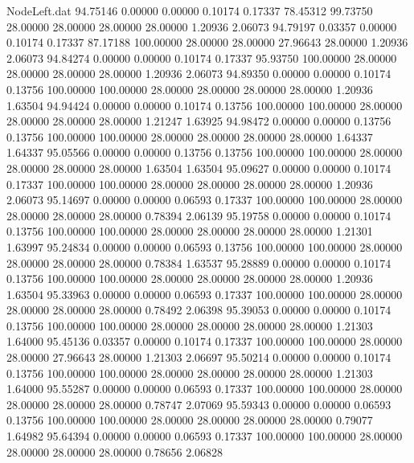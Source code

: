 \begin{filecontents}{NodeLeft.dat}
  94.75146    0.00000    0.00000     0.10174    0.17337   78.45312   99.73750   28.00000   28.00000   28.00000   28.00000    1.20936    2.06073
  94.79197    0.03357    0.00000     0.10174    0.17337   87.17188  100.00000   28.00000   28.00000   27.96643   28.00000    1.20936    2.06073
  94.84274    0.00000    0.00000     0.10174    0.17337   95.93750  100.00000   28.00000   28.00000   28.00000   28.00000    1.20936    2.06073
  94.89350    0.00000    0.00000     0.10174    0.13756  100.00000  100.00000   28.00000   28.00000   28.00000   28.00000    1.20936    1.63504
  94.94424    0.00000    0.00000     0.10174    0.13756  100.00000  100.00000   28.00000   28.00000   28.00000   28.00000    1.21247    1.63925
  94.98472    0.00000    0.00000     0.13756    0.13756  100.00000  100.00000   28.00000   28.00000   28.00000   28.00000    1.64337    1.64337
  95.05566    0.00000    0.00000     0.13756    0.13756  100.00000  100.00000   28.00000   28.00000   28.00000   28.00000    1.63504    1.63504
  95.09627    0.00000    0.00000     0.10174    0.17337  100.00000  100.00000   28.00000   28.00000   28.00000   28.00000    1.20936    2.06073
  95.14697    0.00000    0.00000     0.06593    0.17337  100.00000  100.00000   28.00000   28.00000   28.00000   28.00000    0.78394    2.06139
  95.19758    0.00000    0.00000     0.10174    0.13756  100.00000  100.00000   28.00000   28.00000   28.00000   28.00000    1.21301    1.63997
  95.24834    0.00000    0.00000     0.06593    0.13756  100.00000  100.00000   28.00000   28.00000   28.00000   28.00000    0.78384    1.63537
  95.28889    0.00000    0.00000     0.10174    0.13756  100.00000  100.00000   28.00000   28.00000   28.00000   28.00000    1.20936    1.63504
  95.33963    0.00000    0.00000     0.06593    0.17337  100.00000  100.00000   28.00000   28.00000   28.00000   28.00000    0.78492    2.06398
  95.39053    0.00000    0.00000     0.10174    0.13756  100.00000  100.00000   28.00000   28.00000   28.00000   28.00000    1.21303    1.64000
  95.45136    0.03357    0.00000     0.10174    0.17337  100.00000  100.00000   28.00000   28.00000   27.96643   28.00000    1.21303    2.06697
  95.50214    0.00000    0.00000     0.10174    0.13756  100.00000  100.00000   28.00000   28.00000   28.00000   28.00000    1.21303    1.64000
  95.55287    0.00000    0.00000     0.06593    0.17337  100.00000  100.00000   28.00000   28.00000   28.00000   28.00000    0.78747    2.07069
  95.59343    0.00000    0.00000     0.06593    0.13756  100.00000  100.00000   28.00000   28.00000   28.00000   28.00000    0.79077    1.64982
  95.64394    0.00000    0.00000     0.06593    0.17337  100.00000  100.00000   28.00000   28.00000   28.00000   28.00000    0.78656    2.06828

\end{filecontents}
